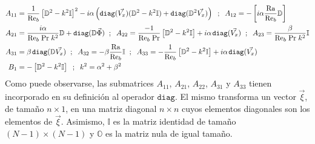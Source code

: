 \begin{align*}
A_{11} &= \frac{1}{\text{Re}_b} \left[ \mathbb{D}^2 - k^2 \mathbb{I} \right]^2 - i \alpha \left( \mathtt{diag}(\vec{V_x}) ( \mathbb{D}^2 - k^2 \mathbb{I})  + \mathtt{diag}(\mathbb{D}^2 \vec{V_x}) \right) \hspace{2mm} ; \hspace{2mm} A_{12} = -\left[ i \alpha \frac{\text{Ra}}{\text{Re}_b} \mathbb{D} \right] \\ 
A_{21} &= \frac{i \alpha}{\text{Re}_b \hspace{1mm} \text{Pr} \hspace{1mm} k^2} \mathbb{D} + \mathtt{diag}(\mathbb{D}\vec{\Phi}) \hspace{2mm} ; \hspace{2mm} A_{22} = \frac{-1}{\text{Re}_b \hspace{1mm} \text{Pr} } \left[ \mathbb{D}^2 - k^2 \mathbb{I} \right] + i \alpha \hspace{0.4mm} \mathtt{diag}(\vec{V_x})  \hspace{2mm} ; \hspace{2mm} A_{23} = \frac{\beta}{\text{Re}_b \hspace{1mm} \text{Pr} \hspace{1mm} k^2} \mathbb{I} \\
A_{31} &= \beta \hspace{0.4mm} \mathtt{diag}(\mathbb{D} \vec{V_x}) \hspace{2mm} ; \hspace{2mm} A_{32} = - \beta \frac{\text{Ra}}{\text{Re}_b} \mathbb{I}   \hspace{2mm} ; \hspace{2mm} A_{33} = -\frac{1}{\text{Re}_b} \left[ \mathbb{D}^2 - k^2 \mathbb{I} \right] + i \alpha \hspace{0.4mm}  \mathtt{diag}(\vec{V_x}) \\
B_1    &= - \left[ \mathbb{D}^2 - k^2 \mathbb{I} \right] \hspace{2mm} ; \hspace{2mm} k^2 = \alpha^2 + \beta^2 \\
\end{align*}
Como puede observarse, las submatrices $A_{11}$, $A_{21}$, $A_{22}$, $A_{31}$ y $A_{33}$ tienen incorporado en su definición al operador $\mathtt{diag}$. El mismo transforma un vector $\vec{\xi}$, de tamaño $n \times 1$, en una matriz diagonal $n \times n$ cuyos elementos diagonales son los elementos de $\vec{\xi}$. Asimismo, $\mathbb{I}$ es la matriz identidad de tamaño $(N-1) \times (N-1)$ y $\mathbb{O}$ es la matriz nula de igual tamaño.

